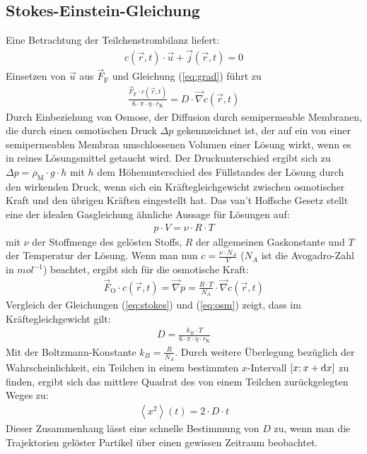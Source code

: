 \documentclass[numbers=noenddot,12pt,a4paper]{scrartcl}
\newcommand{\diff}{\textnormal{d}}
\newcommand{\ix}[1]{_\text{#1}}
\begin{document}
\subsection{Stokes-Einstein-Gleichung}
Eine Betrachtung der Teilchenstrombilanz liefert:
\begin{align}
c(\vec{r},t)\cdot\vec{u}+\vec{j}(\vec{r},t)=0
\end{align}
Einsetzen von $\vec{u}$ aus $\vec{F}\ix{F}$ und Gleichung (\ref{eq:grad}) führt zu
\begin{align}
\frac{\vec{F}\ix{F}\cdot c(\vec{r},t)}{6\cdot\pi\cdot\eta\cdot r\ix{K}}=D\cdot\vec{\nabla}c(\vec{r},t)\label{eq:stokes}
\end{align}
Durch Einbeziehung von Osmose, der Diffusion durch semipermeable Membranen, die durch einen osmotischen Druck $\Delta p$ gekennzeichnet ist, der auf ein von einer semipermeablen Membran umschlossenen Volumen einer Lösung wirkt, wenn es in reines Lösungsmittel getaucht wird. Der Druckunterschied ergibt sich zu $\Delta p=\rho\ix{M}\cdot g\cdot h$ mit $h$ dem Höhenunterschied des Füllstandes der Lösung durch den wirkenden Druck, wenn sich ein Kräftegleichgewicht zwischen osmotischer Kraft und den übrigen Kräften eingestellt hat. Das van't Hoffsche Gesetz stellt eine der idealen Gasgleichung ähnliche Aussage für Lösungen auf:
\begin{align}
p\cdot V=\nu\cdot R\cdot T
\end{align}
mit $\nu$ der Stoffmenge des gelösten Stoffs, $R$ der allgemeinen Gaskonstante und $T$ der Temperatur der Lösung. Wenn man nun $c=\frac{\nu\cdot N_A}{V}$ ($N_A$ ist die Avogadro-Zahl in $\unit{mol^{-1}}$) beachtet, ergibt sich für die osmotische Kraft:
\begin{align}
\vec{F}\ix{O}\cdot c(\vec{r},t)=\vec{\nabla} p=\frac{R\cdot T}{N_A}\cdot\vec{\nabla} c(\vec{r},t)\label{eq:osm}
\end{align}
Vergleich der Gleichungen (\ref{eq:stokes}) und (\ref{eq:osm}) zeigt, dass im Kräftegleichgewicht gilt:
\begin{align}
D=\frac{k_B\cdot T}{6\cdot\pi\cdot\eta\cdot r\ix{K}}
\end{align}
Mit der Boltzmann-Konstante $k_B=\frac{R}{N_A}$. Durch weitere Überlegung bezüglich der Wahrscheinlichkeit, ein Teilchen in einem bestimmten $x$-Intervall $\left[x;x+\diff x\right]$ zu finden, ergibt sich das mittlere Quadrat des von einem Teilchen zurückgelegten Weges zu:
\begin{align}
\left\langle x^2 \right\rangle(t)=2\cdot D\cdot t
\end{align}
Dieser Zusammenhang lässt eine schnelle Bestimmung von $D$ zu, wenn man die Trajektorien gelöster Partikel über einen gewissen Zeitraum beobachtet.
\end{document}
